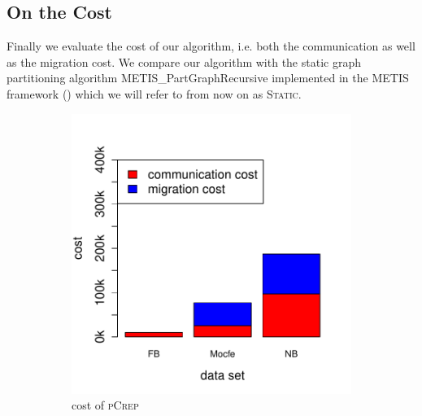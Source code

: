 \documentclass[a4paper,UKenglish,cleveref, autoref, thm-restate,authorcolumns]{lipics-v2019}
\newcommand{\adjDel}{\textsc{pCrep}}
\newcommand{\static}{\textsc{Static}}
\begin{document}
\subsection{On the Cost}
Finally we evaluate the cost of our algorithm, i.e. both the communication as well 
as the migration cost. We compare our algorithm with the static graph partitioning algorithm METIS\_PartGraphRecursive implemented in the METIS framework (\cite{Karypis1998, Karypis1998a}) which we will refer to from now on as \static{}.

\begin{figure}[h]
	\centering
	\begin{minipage}{0.48\linewidth}
		\begin{subfigure}[b]{\linewidth}
			\includegraphics*[width=\linewidth]{"plots/plot_cost_decompTree"}
			\caption{cost of \adjDel}
		\end{subfigure}		
	\end{minipage}
	\begin{minipage}{0.48\linewidth}
		\begin{subfigure}[b]{\linewidth}

\end{subfigure}
\end{minipage}
\end{figure}
\end{document}
